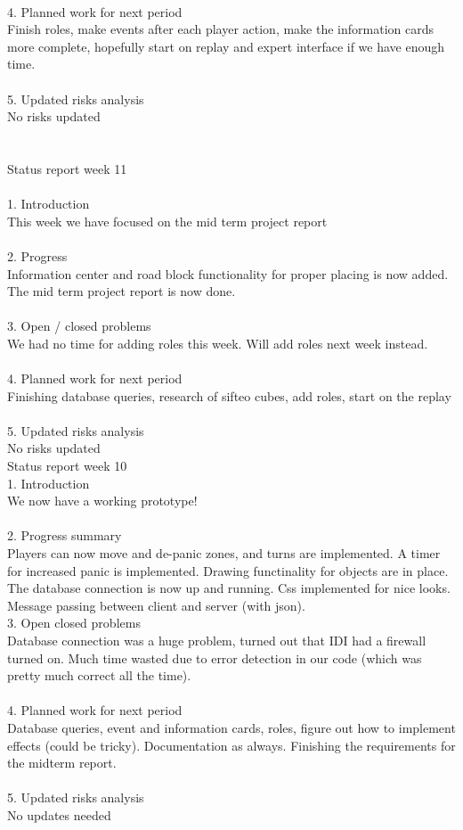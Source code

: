\\
4. Planned work for next period\\
Finish roles, make events after each player action, make the information cards more complete, hopefully start on replay and expert interface if we have enough time.\\
\\
5. Updated risks analysis\\
No risks updated\\
\\
\\
Status report week 11\\
\\
1. Introduction\\
This week we have focused on the mid term project report\\
\\
2. Progress\\
Information center and road block functionality for proper placing is now added. The mid term project report is now done. \\
\\
3. Open / closed problems\\
We had no time for adding roles this week. Will add roles next week instead. \\
\\
4. Planned work for next period\\
Finishing database queries, research of sifteo cubes, add roles, start on the replay\\
\\
5. Updated risks analysis\\
No risks updated\\

\noindent Status report week 10\\
1. Introduction\\
We now have a working prototype!\\
\\
2. Progress summary\\
Players can now move and de-panic zones, and turns are implemented. A timer for increased panic is implemented. Drawing functinality for objects are in place. The database connection is now up and running. Css implemented for nice looks. Message passing between client and server (with json).
\\
3. Open closed problems\\
Database connection was a huge problem, turned out that IDI had a firewall turned on. Much time wasted due to error detection in our code (which was pretty much correct all the time).\\
\\
4. Planned work for next period\\
Database queries, event and information cards, roles, figure out how to implement effects (could be tricky). Documentation as always. Finishing the requirements for the midterm report.\\
\\
5. Updated risks analysis\\
No updates needed\\
\\

